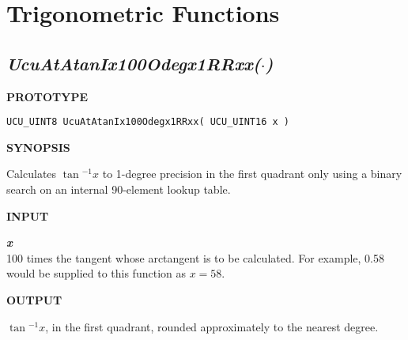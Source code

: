 \section{Trigonometric Functions}
\label{cafn0:strf0}


\subsection[\emph{UcuAtAtanIx100Odegx1RRxx(\protect\mbox{\protect$\cdot$})}]
           {\emph{UcuAtAtanIx100Odegx1RRxx(\protect\mbox{\protect\boldmath $\cdot$})}}
\label{cafn0:strf0:sata0}

%

\noindent\textbf{PROTOTYPE}
\begin {list}{}{\setlength{\leftmargin}{0.25in}\setlength{\topsep}{0.0in}}
\item
\begin{verbatim}
UCU_UINT8 UcuAtAtanIx100Odegx1RRxx( UCU_UINT16 x )
\end{verbatim}
\end{list}
\vspace{2.8ex}

\noindent\textbf{SYNOPSIS}
\begin{list}{}{\setlength{\leftmargin}{0.25in}\setlength{\topsep}{0.0in}}
\item Calculates $\tan{}^{-1}x$ to 1-degree precision in the first quadrant
      only using a binary search on an internal 90-element lookup table.
\end{list}
\vspace{2.8ex}

\noindent\textbf{INPUT}
\begin{list}{}{\setlength{\leftmargin}{0.5in}\setlength{\itemindent}{-0.25in}\setlength{\topsep}{0.0in}\setlength{\partopsep}{0.0in}}
\item \emph{\textbf{x}}\\
      100 times the tangent whose arctangent is to be calculated.
      For example, 0.58 would be supplied to this function
      as $x=58$.
\end{list}
\vspace{2.8ex}

\noindent\textbf{OUTPUT}
\begin{list}{}{\setlength{\leftmargin}{0.25in}\setlength{\topsep}{0.0in}}
\item $\tan{}^{-1}x$, in the first quadrant, rounded approximately to the
      nearest degree.
\end{list}
\vspace{2.8ex}

